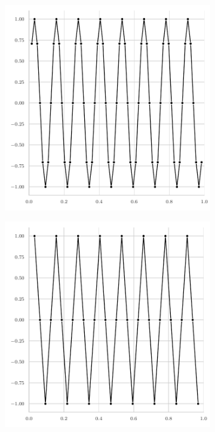 \begin{figure}
\begin{subfigure}[b]{0.32\textwidth}
		\includegraphics[width=\textwidth]{figures/error_plots//initial_error_16pi_level6.pdf}
	\end{subfigure}
	\hfill
	\begin{subfigure}[b]{0.32\textwidth}
		\centering
		\includegraphics[width=\textwidth]{figures/error_plots//initial_error_16pi_level5.pdf}

\end{subfigure}
\end{figure}
